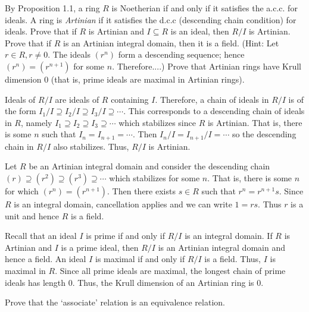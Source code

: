\documentclass[../../master.tex]{subfiles}
\begin{document}
    \begin{problem}
        By Proposition 1.1, a ring $R$ is Noetherian if and only if it satisfies
        the a.c.c. for ideals. A ring is \textit{Artinian} if it satisfies the
        d.c.c (descending chain condition) for ideals. Prove that if $R$ is
        Artinian and $I \subseteq R$ is an ideal, then $R / I$ is Artinian.
        Prove that if $R$ is an Artinian integral domain, then it is a field.
        (Hint: Let $r \in R, r \neq 0$. The ideals $(r^{n})$ form a descending
        sequence; hence $(r^{n}) = (r^{n+1})$ for some $n$. Therefore....) Prove
        that Artinian rings have Krull dimension 0 (that is, prime ideals are
        maximal in Artinian rings).
    \end{problem}

    \begin{solution}
        Ideals of $R / I$ are ideals of $R$ containing $I$. Therefore, a chain
        of ideals in $R / I$ is of the form $I_1 / I \supseteq I_2 / I \supseteq
        I_3 / I \supseteq \cdots$. This corresponds to a descending chain of
        ideals in $R$, namely $I_1 \supseteq I_2 \supseteq I_3 \supseteq \cdots$
        which stabilizes since $R$ is Artinian. That is, there is some $n$
        such that $I_n = I_{n + 1} = \cdots$. Then $I_n / I = I_{n + 1} / I =
        \cdots$ so the descending chain in $R / I$ also stabilizes. Thus, $R /
        I$ is Artinian.

        Let $R$ be an Artinian integral domain and consider the descending chain
        $(r) \supseteq (r^2) \supseteq (r^3) \supseteq \cdots$ which stabilizes
        for some $n$. That is, there is some $n$ for which $(r^{n}) =
        (r^{n+1})$. Then there exists $s \in R$ such that $r^{n} = r^{n+1} s$.
        Since $R$ is an integral domain, cancellation applies and we can write
        $1 = rs$. Thus $r$ is a unit and hence $R$ is a field.

        Recall that an ideal $I$ is prime if and only if $R / I$ is an integral
        domain. If $R$ is Artinian and $I$ is a prime ideal, then $R / I$ is an
        Artinian integral domain and hence a field. An ideal $I$ is maximal if
        and only if $R / I$ is a field. Thus, $I$ is maximal in $R$. Since all
        prime ideals are maximal, the longest chain of prime ideals has length
        0. Thus, the Krull dimension of an Artinian ring is 0.
    \end{solution}

    \begin{problem}
        Prove that the `associate' relation is an equivalence relation.
    \end{problem}
\end{document}

